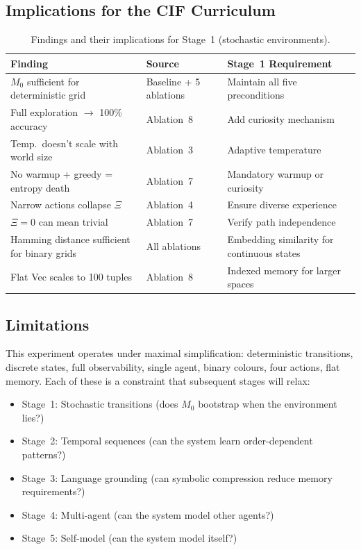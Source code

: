 \documentclass[11pt,a4paper]{article}
\begin{document}
\subsection{Implications for the CIF Curriculum}

\begin{table}[H]
\centering
\small
\begin{tabular}{p{4.2cm}p{3.2cm}p{4.8cm}}
\toprule
Finding & Source & Stage~1 Requirement \\
\midrule
$M_0$ sufficient for deterministic grid & Baseline + 5 ablations & Maintain all five preconditions \\
Full exploration $\rightarrow$ 100\% accuracy & Ablation~8 & Add curiosity mechanism \\
Temp.\ doesn't scale with world size & Ablation~3 & Adaptive temperature \\
No warmup + greedy = entropy death & Ablation~7 & Mandatory warmup or curiosity \\
Narrow actions collapse $\Xi$ & Ablation~4 & Ensure diverse experience \\
$\Xi = 0$ can mean trivial & Ablation~7 & Verify path independence \\
Hamming distance sufficient for binary grids & All ablations & Embedding similarity for continuous states \\
Flat Vec scales to 100 tuples & Ablation~8 & Indexed memory for larger spaces \\
\bottomrule
\end{tabular}
\caption{Findings and their implications for Stage~1 (stochastic environments).}
\label{tab:findings}
\end{table}

\subsection{Limitations}

This experiment operates under maximal simplification: deterministic transitions, discrete states, full observability, single agent, binary colours, four actions, flat memory. Each of these is a constraint that subsequent stages will relax:

\begin{itemize}[nosep]
    \item Stage~1: Stochastic transitions (does $M_0$ bootstrap when the environment lies?)
    \item Stage~2: Temporal sequences (can the system learn order-dependent patterns?)
    \item Stage~3: Language grounding (can symbolic compression reduce memory requirements?)
    \item Stage~4: Multi-agent (can the system model other agents?)
    \item Stage~5: Self-model (can the system model itself?)
\end{itemize}
\end{document}
